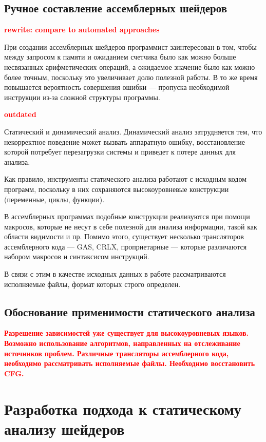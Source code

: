 \documentclass[a4paper,14pt]{extarticle}
\newcommand{\todo}[1]{\textbf{\textcolor{red}{#1}}}
\begin{document}
\subsection{Ручное составление ассемблерных шейдеров}

\todo{rewrite: compare to automated approaches}

При создании ассемблерных шейдеров программист заинтересован в том,
чтобы между запросом к памяти и ожиданием счетчика было как можно больше несвязанных
арифметических операций, а ожидаемое значение было как можно более точным, поскольку
это увеличивает долю полезной работы. В то же время повышается вероятность совершения
ошибки — пропуска необходимой инструкции из-за сложной структуры программы.

\todo{outdated}

Статический и динамический анализ. Динамический анализ затрудняется тем, что некорректное
поведение может вызвать аппаратную ошибку, восстановление которой потребует перезагрузки
системы и приведет к потере данных для анализа.  %

Как правило, инструменты статического анализа работают с исходным кодом программ,
поскольку в них сохраняются высокоуровневые конструкции (переменные, циклы, функции).

В ассемблерных программах подобные конструкции реализуются при помощи макросов,
которые не несут в себе полезной для анализа информации, такой как области видимости и пр.
Помимо этого, существует несколько трансляторов ассемблерного кода — GAS, CRLX, проприетарные — которые
различаются набором макросов и синтаксисом инструкций.

В связи с этим в качестве исходных данных в работе рассматриваются исполняемые файлы,
формат которых строго определен.

\subsection{Обоснование применимости статического анализа}

\todo{Разрешение зависимостей уже существует для высокоуровневых языков. Возможно использование алгоритмов, направленных на отслеживание источников проблем. Различные трансляторы ассемблерного кода, необходимо рассматривать исполняемые файлы. Необходимо восстановить CFG.}

\section{Разработка подхода к статическому анализу шейдеров}
\end{document}
